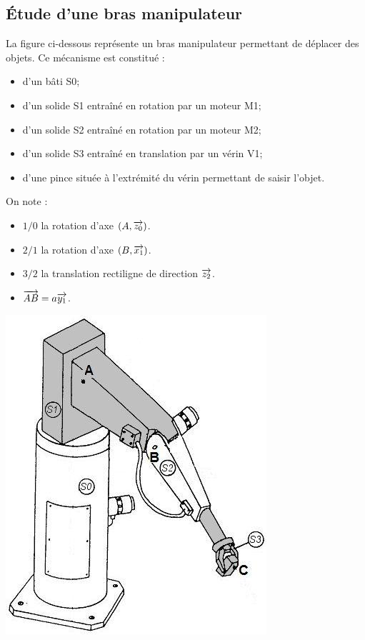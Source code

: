 \documentclass[10pt,fleqn]{article} %
\begin{document}
\begin{multicols}{2}

\section*{Étude d'une bras manipulateur}


La figure ci-dessous représente un bras manipulateur permettant de déplacer des objets.
Ce mécanisme est constitué :
\begin{itemize}
\item d'un bâti S0;
\item d'un solide S1 entraîné en rotation par un moteur M1;
\item d'un solide S2 entraîné en rotation par un moteur M2;
\item d'un solide S3 entraîné en translation par un vérin V1;
\item d'une pince située à l’extrémité du vérin permettant de saisir l’objet.
\end{itemize}

On note : 
\begin{itemize}
\item $1/0$ la rotation d'axe $(A,\overrightarrow{z_0})$.
\item $2/1$ la rotation d'axe $(B,\overrightarrow{x_1})$.
\item $3/2$ la translation rectiligne de direction $\overrightarrow{z_2}$.
\item $\overrightarrow{AB}=a\overrightarrow{y_1}$.
\end{itemize}


\begin{center}
\includegraphics[width=.7\linewidth]{images/bras1}
\end{center}


\end{multicols}
\end{document}
